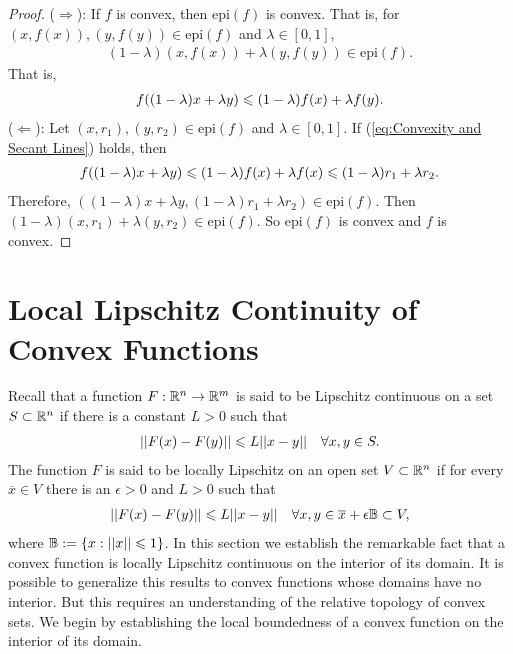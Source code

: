 \begin{proof}
    ($\Rightarrow$): If $f$ is convex, then $\text{epi}(f)$ is convex. That is, 
    for $(x,f(x)),(y,f(y))\in \text{epi}(f)$ and $\lambda\in [0,1]$, 
    \begin{align*}
        (1-\lambda) (x,f(x)) +\lambda (y,f(y))\in \text{epi}(f).
    \end{align*}
    That is,
    \begin{align*}
        f((1-\lambda)x+\lambda y)\leqslant (1-\lambda)f(x)+\lambda f(y).
    \end{align*}
    ($\Leftarrow$):
    Let $(x,r_1),(y,r_2)\in \text{epi}(f)$ and $\lambda\in [0,1]$. If (\ref{eq:Convexity and Secant Lines}) holds, then 
    \begin{align*}
        f((1-\lambda)x+\lambda y)\leqslant (1-\lambda)f(x)+\lambda f(x)\leqslant (1-\lambda)r_1+\lambda r_2.
    \end{align*}
    Therefore, $((1-\lambda)x+\lambda y, (1-\lambda)r_1+\lambda r_2)\in \text{epi}(f)$. Then 
    $(1-\lambda) (x,r_1) + \lambda (y,r_2)\in \text{epi}(f)$. So $\text{epi}(f)$ is convex and $f$ is convex.
\end{proof}

\section{Local Lipschitz Continuity of Convex Functions}

Recall that a function $F:\mathbb{R}^n\rightarrow \mathbb{R}^m$ is said to be Lipschitz continuous on a set $S\subset \mathbb{R}^n$
if there is a constant $L>0$ such that 
\begin{align*}
    ||F(x)-F(y)||\leqslant L||x-y|| \quad \forall x,y\in S.
\end{align*}
The function $F$ is said to be locally Lipschitz on an open set $V\subset \mathbb{R}^n$ if for every $\overline{x}\in V$ there is an $\epsilon>0$ and $L>0$ such that 
\begin{align*}
    ||F(x)-F(y)||\leqslant L||x-y|| \quad \forall x,y\in \overline{x}+\epsilon \mathbb{B}\subset V,
\end{align*}
where $\mathbb{B}:=\{x:||x||\leqslant 1\}$. In this section we establish the remarkable fact that a convex function is locally Lipschitz continuous
on the interior of its domain. It is possible to generalize this results to convex functions whose domains
have no interior. But this requires an understanding of the relative topology of convex sets. We begin by
establishing the local boundedness of a convex function on the interior of its domain.

